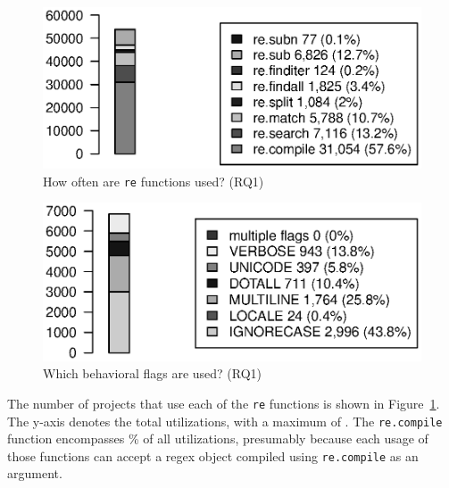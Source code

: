 \begin{figure}[tb]
\centering
\includegraphics[width=\columnwidth]{../analysis_output/partFunctions.eps}
\vspace{-6pt}
\caption{How often are  {\tt re} functions used? (RQ1)}
\vspace{-6pt}
\label{fig:partFunctions}
\end{figure}

\begin{figure}[tb]
\centering
\includegraphics[width=0.9\columnwidth]{../analysis_output/partFlags.eps}
\vspace{-6pt}
\caption{Which behavioral flags are used? (RQ1)}
\label{fig:partFlags}
\end{figure}



The number of projects that use each of the {\tt re} functions is shown in Figure~\ref{fig:partFunctions}.  The y-axis denotes the total utilizations, with a maximum of . The {\tt re.compile} function encompasses \% of all utilizations, presumably because each usage of those functions can accept a regex object compiled using {\tt re.compile} as an argument.

